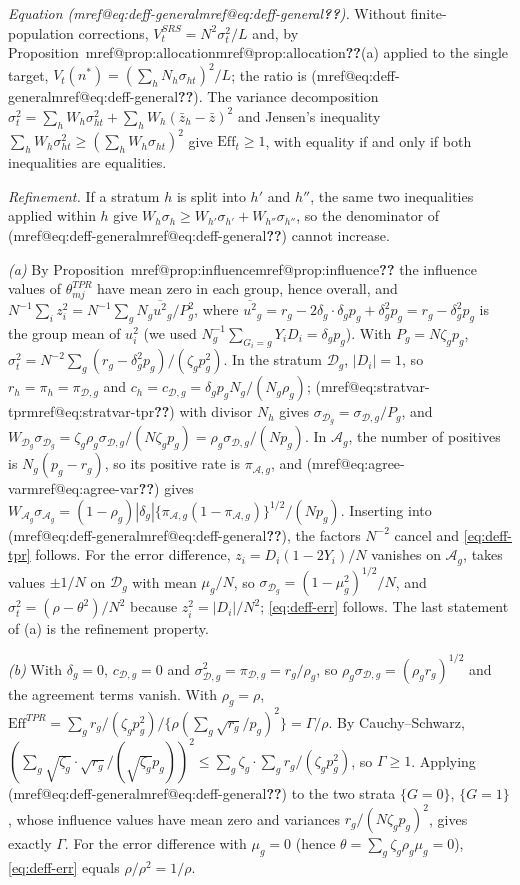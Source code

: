 \documentclass[pdflatex,sn-mathphys-num,iicol]{sn-jnl}
\makeatletter
\theoremstyle{thmstyleone}
\theoremstyle{thmstyletwo}
\theoremstyle{thmstylethree}
\newcommand{\Mref}[1]{\ifcsname mref@#1\endcsname\csname mref@#1\endcsname\else\textbf{??}\fi}
\makeatother
\begin{document}
\emph{Equation (\Mref{eq:deff-general}).} Without finite-population corrections,
$V^{SRS}_t=N^2\sigma^2_t/L$ and, by Proposition~\Mref{prop:allocation}(a) applied to the single
target, $V_t(n^\ast)=(\sum_hN_h\sigma_{ht})^2/L$; the ratio is (\Mref{eq:deff-general}). The variance
decomposition $\sigma_t^2=\sum_hW_h\sigma_{ht}^2+\sum_hW_h(\bar z_h-\bar z)^2$ and Jensen's inequality
$\sum_hW_h\sigma_{ht}^2\ge(\sum_hW_h\sigma_{ht})^2$ give $\mathrm{Eff}_t\ge1$, with equality if and
only if both inequalities are equalities.

\emph{Refinement.} If a stratum $h$ is split into $h'$ and $h''$, the same two inequalities
applied within $h$ give $W_h\sigma_h\ge W_{h'}\sigma_{h'}+W_{h''}\sigma_{h''}$, so the denominator of
(\Mref{eq:deff-general}) cannot increase.

\emph{(a)} By Proposition~\Mref{prop:influence} the influence values of $\theta^{TPR}_{mj}$ have mean
zero in each group, hence overall, and $N^{-1}\sum_iz_i^2=N^{-1}\sum_gN_g\overline{u^2}_g/P_g^2$,
where $\overline{u^2}_g=r_g-2\delta_g\cdot\delta_gp_g+\delta_g^2p_g=r_g-\delta_g^2p_g$ is the group mean
of $u_i^2$ (we used $N_g^{-1}\sum_{G_i=g}Y_iD_i=\delta_gp_g$). With $P_g=N\zeta_gp_g$,
$\sigma_t^2=N^{-2}\sum_g(r_g-\delta_g^2p_g)/(\zeta_gp_g^2)$. In the stratum $\mathcal D_g$,
$|D_i|=1$, so $r_h=\pi_h=\pi_{\mathcal D,g}$ and $c_h=c_{\mathcal D,g}=\delta_gp_gN_g/(N_g\rho_g)$;
(\Mref{eq:stratvar-tpr}) with divisor $N_h$ gives $\sigma_{\mathcal D_g}=\sigma_{\mathcal D,g}/P_g$, and
$W_{\mathcal D_g}\sigma_{\mathcal D_g}=\zeta_g\rho_g\sigma_{\mathcal D,g}/(N\zeta_gp_g)=
\rho_g\sigma_{\mathcal D,g}/(Np_g)$. In $\mathcal A_g$, the number of positives is
$N_g(p_g-r_g)$, so its positive rate is $\pi_{\mathcal A,g}$, and (\Mref{eq:agree-var}) gives
$W_{\mathcal A_g}\sigma_{\mathcal A_g}=(1-\rho_g)|\delta_g|\{\pi_{\mathcal A,g}(1-\pi_{\mathcal A,g})\}^{1/2}/(Np_g)$.
Inserting into (\Mref{eq:deff-general}), the factors $N^{-2}$ cancel and \eqref{eq:deff-tpr} follows.
For the error difference, $z_i=D_i(1-2Y_i)/N$ vanishes on $\mathcal A_g$, takes values $\pm1/N$ on
$\mathcal D_g$ with mean $\mu_g/N$, so $\sigma_{\mathcal D_g}=(1-\mu_g^2)^{1/2}/N$, and
$\sigma_t^2=(\rho-\theta^2)/N^2$ because $z_i^2=|D_i|/N^2$; \eqref{eq:deff-err} follows. The last
statement of (a) is the refinement property.

\emph{(b)} With $\delta_g=0$, $c_{\mathcal D,g}=0$ and $\sigma^2_{\mathcal D,g}=\pi_{\mathcal D,g}=r_g/\rho_g$,
so $\rho_g\sigma_{\mathcal D,g}=(\rho_gr_g)^{1/2}$ and the agreement terms vanish. With $\rho_g=\rho$,
$\mathrm{Eff}^{TPR}=\sum_gr_g/(\zeta_gp_g^2)\big/\{\rho(\sum_g\sqrt{r_g}/p_g)^2\}=\Gamma/\rho$. By
Cauchy--Schwarz, $(\sum_g\sqrt{\zeta_g}\cdot\sqrt{r_g}/(\sqrt{\zeta_g}p_g))^2\le\sum_g\zeta_g\cdot
\sum_gr_g/(\zeta_gp_g^2)$, so $\Gamma\ge1$. Applying (\Mref{eq:deff-general}) to the two strata
$\{G=0\}$, $\{G=1\}$, whose influence values have mean zero and variances $r_g/(N\zeta_gp_g)^2$, gives
exactly $\Gamma$. For the error difference with $\mu_g=0$ (hence $\theta=\sum_g\zeta_g\rho_g\mu_g=0$),
\eqref{eq:deff-err} equals $\rho/\rho^2=1/\rho$.
\end{document}
